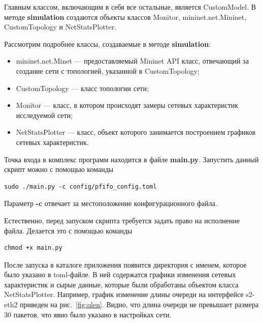 \documentclass[60x84/16,8pt]{ittmm}
\begin{document}
Главным классом, включающим в себя все
остальные, является CustomModel. В методе \textbf{simulation}
создаются объекты классов Monitor, mininet.net.Mininet, Custom\-Topology
и NetStatsPlotter.









Рассмотрим подробнее классы, создаваемые в методе \textbf{simulation}:
\begin{itemize}
\item mininet.net.Minet --- предоставляемый Mininet API класс,
  отвечающий за создание сети с топологией, указанной в
  CustomTopology;
\item CustomTopology --- класс топологии сети; %
\item Monitor --- класс, в котором происходят замеры сетевых
  характеристик исследуемой сети;
\item NetStatsPlotter --- класс, объект которого занимается
  построением графиков сетевых характеристик.
\end{itemize}

Точка входа в комплекс программ находится в файле \textbf{main.py}. Запустить
данный скрипт можно с помощью команды

\begin{lstlisting}[breaklines=true, basicstyle=\ttfamily\small, xleftmargin=\parindent]
  sudo ./main.py -c config/pfifo_config.toml
\end{lstlisting}

Параметр \textbf{-c} отвечает за местоположение конфигурационного файла.

Естественно, перед запуском скрипта требуется задать право на
исполнение файла. Делается это с помощью команды

\begin{lstlisting}[breaklines=true, basicstyle=\ttfamily\small, xleftmargin=\parindent]
  chmod +x main.py
\end{lstlisting}

После запуска в каталоге приложения появится директория с именем,
которое было указано в toml-файле. В ней содержатся графики изменения
сетевых характеристик и сырые данные, которые были обработаны объектом
класса NetStatsPlotter. Например, график изменение длины очереди на
интерфейсе s2-eth2 приведен на рис.~\ref{fig:qlen}. Видно, что
длина очереди не превышает размера 30 пакетов, что явно было указано в
настройках сети.
\end{document}
